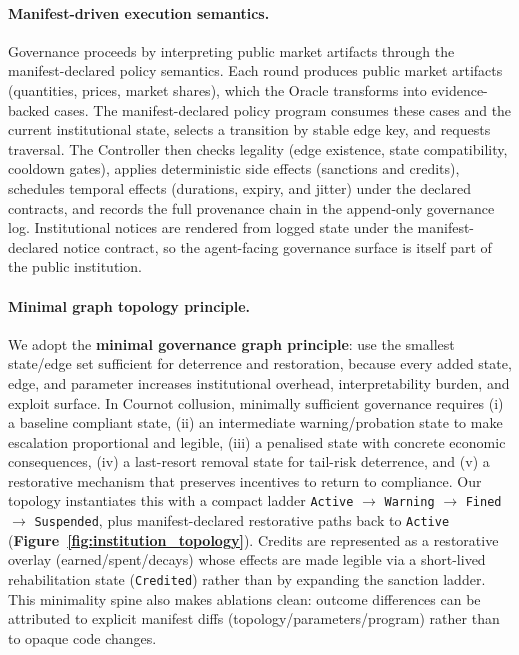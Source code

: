 \documentclass[11pt, a4paper]{article}
\begin{document}
\paragraph{Manifest-driven execution semantics.}
Governance proceeds by interpreting public market artifacts through the manifest-declared policy semantics. Each round produces public market artifacts (quantities, prices, market shares), which the Oracle transforms into evidence-backed cases. The manifest-declared policy program consumes these cases and the current institutional state, selects a transition by stable edge key, and requests traversal. The Controller then checks legality (edge existence, state compatibility, cooldown gates), applies deterministic side effects (sanctions and credits), schedules temporal effects (durations, expiry, and jitter) under the declared contracts, and records the full provenance chain in the append-only governance log. Institutional notices are rendered from logged state under the manifest-declared notice contract, so the agent-facing governance surface is itself part of the public institution.
\begin{center}
\end{center}

\paragraph{Minimal graph topology principle.}
We adopt the \textbf{minimal governance graph principle}: use the smallest state/edge set sufficient for deterrence and restoration, because every added state, edge, and parameter increases institutional overhead, interpretability burden, and exploit surface. In Cournot collusion, minimally sufficient governance requires (i) a baseline compliant state, (ii) an intermediate warning/probation state to make escalation proportional and legible, (iii) a penalised state with concrete economic consequences, (iv) a last-resort removal state for tail-risk deterrence, and (v) a restorative mechanism that preserves incentives to return to compliance. Our topology instantiates this with a compact ladder \texttt{Active} $\rightarrow$ \texttt{Warning} $\rightarrow$ \texttt{Fined} $\rightarrow$ \texttt{Suspended}, plus manifest-declared restorative paths back to \texttt{Active} (\textbf{Figure~\ref{fig:institution_topology}}). Credits are represented as a restorative overlay (earned/spent/decays) whose effects are made legible via a short-lived rehabilitation state (\texttt{Credited}) rather than by expanding the sanction ladder. This minimality spine also makes ablations clean: outcome differences can be attributed to explicit manifest diffs (topology/parameters/program) rather than to opaque code changes.
\end{document}
